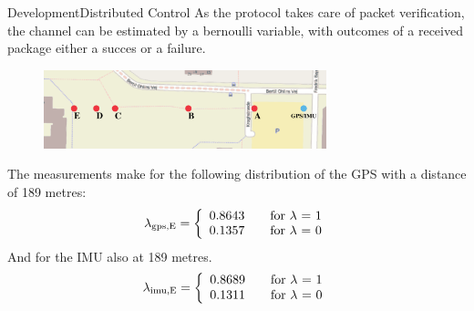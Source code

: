 \documentclass[10pt]{beamer}
\begin{document}
\begin{frame}{Development}{Distributed Control}
As the protocol takes care of packet verification, the channel can be estimated by a bernoulli variable, with outcomes of a received package either a succes or a failure.
\begin{figure}
	\begin{center}
		\includegraphics[width=8.2cm]{img/measpoint}
		\label{fig:measpoint}
	\end{center}
\end{figure}
The measurements make for the following distribution of the GPS with a distance of 189 metres:
\begin{align}
\lambda_\text{gps,E} = \left\{ 
  \begin{array}{l l}
    0.8643 & \quad \text{for $\lambda$ = 1}\\
    0.1357 & \quad \text{for $\lambda$ = 0}
  \end{array} \right.
\end{align}
And for the IMU also at 189 metres.
\begin{align}
\lambda_\text{imu,E} = \left\{ 
  \begin{array}{l l}
    0.8689 & \quad \text{for $\lambda$ = 1}\\
    0.1311 & \quad \text{for $\lambda$ = 0}
  \end{array} \right.
\end{align}
\end{frame}
\end{document}
